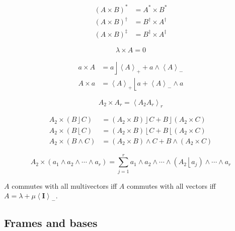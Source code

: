 \documentclass{utarticle}
\newcommand{\bl}[1]{\ensuremath{\bm{#1}}}
\DeclareMathOperator{\lin}{\rfloor}
\DeclareMathOperator{\rin}{\lfloor}
\DeclareMathOperator{\out}{\wedge}
\newcommand{\grinv}[2][]{\ensuremath{#2^{*#1}}}
\newcommand{\rev}[1]{\ensuremath{#1^\dagger}}
\newcommand{\clifconj}[1]{\ensuremath{#1^\ddagger}}
\newcommand{\commute}[2]{\ensuremath{#1 \times #2}}
\newcommand{\grade}[2][]{\ensuremath{\left\langle #2 \right\rangle_{#1}}}
\begin{document}
\begin{align}
\grinv{(\commute{A}{B})} & = \commute{\grinv{A}}{\grinv{B}} \\
\rev{(\commute{A}{B})} & = \commute{\rev{B}}{\rev{A}} \\
\clifconj{(\commute{A}{B})} & = \commute{\clifconj{B}}{\clifconj{A}}
\end{align} 

\begin{equation} \commute{\lambda}{A} = 0 \end{equation}

\begin{align}
\commute{a}{A} & = a \lin \grade[+]{A} + a \out \grade[-]{A} \\
\commute{A}{a} & = \grade[+]{A} \rin a + \grade[-]{A} \out a
\end{align}

\begin{equation}
\commute{A_2}{A_r} = \grade[r]{A_2 A_r}
\end{equation}

\begin{align}
\commute{A_2}{(B \lin C)} & = (\commute{A_2}{B}) \lin C + B \lin (\commute{A_2}{C}) \\
\commute{A_2}{(B \rin C)} & = (\commute{A_2}{B}) \rin C + B \rin (\commute{A_2}{C})  \\ 
\commute{A_2}{(B \out C)} & = (\commute{A_2}{B}) \out C + B \out (\commute{A_2}{C})
\end{align}

\begin{equation}
\commute{A_2}{(a_1 \out a_2 \out \dotsb \out a_r)} = \sum_{j=1}^r a_1 
    \out a_2 \out \dotsb \out (A_2 \rin a_j) \out \dotsb \out a_r
\end{equation}

\noindent $A$ commutes with all multivectors iff $A$ commutes with all vectors iff $A = \lambda + \mu\grade[-]{\bl{I}}$.

\subsection{Frames and bases}
\label{app:frames}
\end{document}

